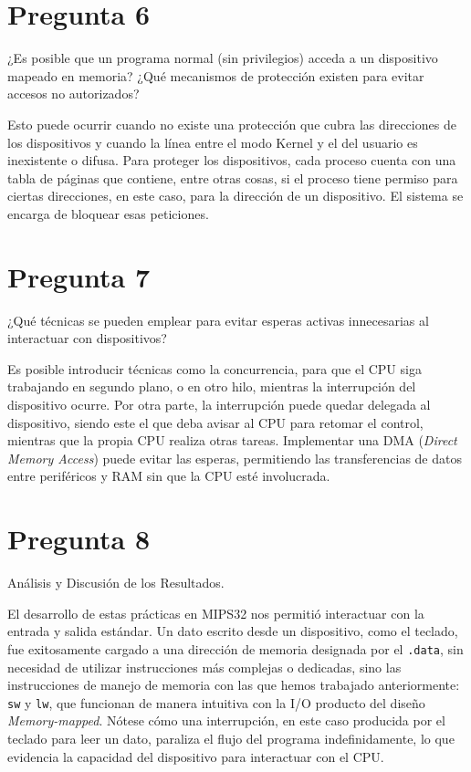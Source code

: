 \documentclass[12pt]{article}
\begin{document}
\section*{Pregunta 6}
¿Es posible que un programa normal (sin privilegios) acceda a un dispositivo mapeado en memoria? ¿Qué mecanismos de protección existen para evitar accesos no autorizados?

Esto puede ocurrir cuando no existe una protección que cubra las direcciones de los dispositivos y cuando la línea entre el modo Kernel y el del usuario es inexistente o difusa. Para proteger los dispositivos, cada proceso cuenta con una tabla de páginas que contiene, entre otras cosas, si el proceso tiene permiso para ciertas direcciones, en este caso, para la dirección de un dispositivo. El sistema se encarga de bloquear esas peticiones.

\section*{Pregunta 7}
¿Qué técnicas se pueden emplear para evitar esperas activas innecesarias al interactuar con dispositivos?

Es posible introducir técnicas como la concurrencia, para que el CPU siga trabajando en segundo plano, o en otro hilo, mientras la interrupción del dispositivo ocurre. Por otra parte, la interrupción puede quedar delegada al dispositivo, siendo este el que deba avisar al CPU para retomar el control, mientras que la propia CPU realiza otras tareas. Implementar una DMA (\textit{Direct Memory Access}) puede evitar las esperas, permitiendo las transferencias de datos entre periféricos y RAM sin que la CPU esté involucrada.

\section*{Pregunta 8}
Análisis y Discusión de los Resultados.

El desarrollo de estas prácticas en MIPS32 nos permitió interactuar con la entrada y salida estándar. Un dato escrito desde un dispositivo, como el teclado, fue exitosamente cargado a una dirección de memoria designada por el \texttt{.data}, sin necesidad de utilizar instrucciones más complejas o dedicadas, sino las instrucciones de manejo de memoria con las que hemos trabajado anteriormente: \texttt{sw} y \texttt{lw}, que funcionan de manera intuitiva con la I/O producto del diseño \textit{Memory-mapped}. Nótese cómo una interrupción, en este caso producida por el teclado para leer un dato, paraliza el flujo del programa indefinidamente, lo que evidencia la capacidad del dispositivo para interactuar con el CPU.
\end{document}
